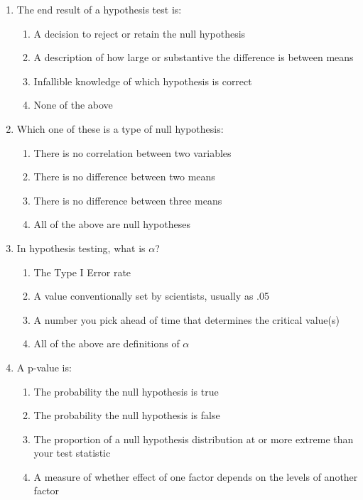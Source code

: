 \documentclass{article}
\begin{document}
\begin{enumerate}[label=\textbf{Q\arabic*:}]
    \item The end result of a hypothesis test is:
    \begin{enumerate}[label=\alph*)]
        \item A decision to reject or retain the null hypothesis
        \item A description of how large or substantive the difference is between means
        \item Infallible knowledge of which hypothesis is correct
        \item None of the above
    \end{enumerate}

    \item Which one of these is a type of null hypothesis:
    \begin{enumerate}[label=\alph*)]
        \item There is no correlation between two variables
        \item There is no difference between two means
        \item There is no difference between three means 
        \item All of the above are null hypotheses
    \end{enumerate}

    \item In hypothesis testing, what is $\alpha$?
    \begin{enumerate}[label=\alph*)]
        \item The Type I Error rate
        \item A value conventionally set by scientists, usually as .05
        \item A number you pick ahead of time that determines the critical value(s)
        \item All of the above are definitions of $\alpha$
    \end{enumerate}

    \item A p-value is:
    \begin{enumerate}[label=\alph*)]
        \item The probability the null hypothesis is true
        \item The probability the null hypothesis is false
        \item The proportion of a null hypothesis distribution at or more extreme than your test statistic
        \item A measure of whether effect of one factor depends on the levels of another factor
    \end{enumerate}


\end{enumerate}
\end{document}

